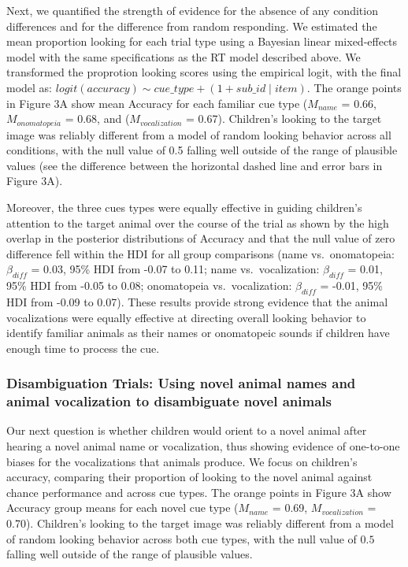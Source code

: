 \documentclass[english,floatsintext,man]{apa6}
\theoremstyle{definition}
\theoremstyle{definition}
\theoremstyle{definition}
\theoremstyle{remark}
\begin{document}
Next, we quantified the strength of evidence for the absence of any
condition differences and for the difference from random responding. We
estimated the mean proportion looking for each trial type using a
Bayesian linear mixed-effects model with the same specifications as the
RT model described above. We transformed the proprotion looking scores
using the empirical logit, with the final model as:
\(logit(accuracy) \sim cue\_type + (1 + sub\_id \mid item)\). The orange
points in Figure 3A show mean Accuracy for each familiar cue type
(\(M_{name}\) = 0.66, \(M_{onomatopeia}\) = 0.68, and
(\(M_{vocalization}\) = 0.67). Children's looking to the target image
was reliably different from a model of random looking behavior across
all conditions, with the null value of 0.5 falling well outside of the
range of plausible values (see the difference between the horizontal
dashed line and error bars in Figure 3A).

Moreover, the three cues types were equally effective in guiding
children's attention to the target animal over the course of the trial
as shown by the high overlap in the posterior distributions of Accuracy
and that the null value of zero difference fell within the HDI for all
group comparisons (name vs.~onomatopeia: \(\beta_{diff}\) = 0.03, 95\%
HDI from -0.07 to 0.11; name vs.~vocalization: \(\beta_{diff}\) = 0.01,
95\% HDI from -0.05 to 0.08; onomatopeia vs.~vocalization:
\(\beta_{diff}\) = -0.01, 95\% HDI from -0.09 to 0.07). These results
provide strong evidence that the animal vocalizations were equally
effective at directing overall looking behavior to identify familiar
animals as their names or onomatopeic sounds if children have enough
time to process the cue.

\subsubsection{Disambiguation Trials: Using novel animal names and
animal vocalization to disambiguate novel
animals}\label{disambiguation-trials-using-novel-animal-names-and-animal-vocalization-to-disambiguate-novel-animals}

Our next question is whether children would orient to a novel animal
after hearing a novel animal name or vocalization, thus showing evidence
of one-to-one biases for the vocalizations that animals produce. We
focus on children's accuracy, comparing their proportion of looking to
the novel animal against chance performance and across cue types. The
orange points in Figure 3A show Accuracy group means for each novel cue
type (\(M_{name}\) = 0.69, \(M_{vocalization}\) = 0.70). Children's
looking to the target image was reliably different from a model of
random looking behavior across both cue types, with the null value of
\(0.5\) falling well outside of the range of plausible values.
\end{document}
